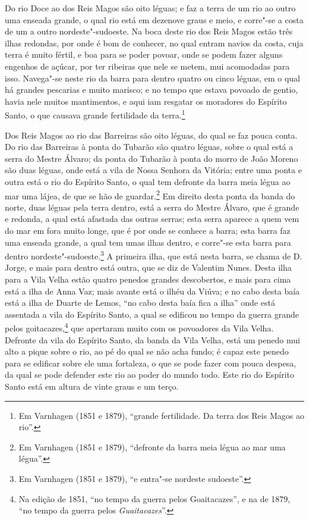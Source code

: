 Do rio Doce ao dos Reis Magos são oito léguas; e faz a terra de um rio ao outro uma
enseada grande, o qual rio está em dezenove graus e meio, e corre"-se a costa de um a outro
nordeste"-sudoeste. Na boca deste rio dos Reis Magos estão três ilhas redondas, por onde é
bom de conhecer, no qual entram navios da costa, cuja terra é muito fértil, e boa para se
poder povoar, onde se podem fazer alguns engenhos de açúcar, por ter ribeiras que nele se
metem, mui acomodadas para isso. Navega"-se neste rio da barra para dentro quatro ou cinco
léguas, em o qual há grandes pescarias e muito marisco; e no tempo que estava povoado de
gentio, havia nele muitos mantimentos, e aqui iam resgatar os moradores do Espírito Santo,
o que causava grande fertilidade da terra.\footnote{ Em Varnhagen (1851 e 1879), ``grande
fertilidade. Da terra dos Reis Magos ao rio''.}

Dos Reis Magos ao rio das Barreiras são oito léguas, do qual se faz pouca conta. Do rio
das Barreiras à ponta do Tubarão são quatro léguas, sobre o qual está a serra do Mestre
Álvaro; da ponta do Tubarão à ponta do morro de João Moreno são duas léguas, onde está a
vila de Nossa Senhora da Vitória; entre uma ponta e outra está o rio do Espírito Santo, o
qual tem defronte da barra meia légua ao mar uma lájea, de que se hão de
guardar.\footnote{ Em Varnhagen (1851 e 1879), ``defronte da barra meia légua ao mar uma
légua''.} Em direito desta ponta da banda do norte, duas léguas pela terra dentro, está a
serra do Mestre Álvaro, que é grande e redonda, a qual está afastada das outras serras;
esta serra aparece a quem vem do mar em fora muito longe, que é por onde se conhece a
barra; esta barra faz uma enseada grande, a qual tem umas ilhas dentro, e corre"-se esta
barra para dentro nordeste"-sudoeste.\footnote{ Em Varnhagen (1851 e 1879), ``e entra"-se
nordeste sudoeste''.} A primeira ilha, que está nesta barra, se chama de D. Jorge, e mais
para dentro está outra, que se diz de Valentim Nunes. Desta ilha para a Vila Velha estão
quatro penedos grandes descobertos, e mais para cima está a ilha de Anna Vaz; mais avante
está o ilhéu da Viúva; e no cabo desta baía está a ilha de Duarte de Lemos, ``no cabo
desta baía fica a ilha'' onde está assentada a vila do Espírito Santo, a qual se edificou
no tempo da guerra grande pelos goitacazes,\footnote{ Na edição de 1851, ``no tempo da
guerra pelos Goaitacazes'', e na de 1879, ``no tempo da guerra pelos
\textit{Guaitacazes}''.} que apertaram muito com os povoadores da Vila Velha. Defronte da
vila do Espírito Santo, da banda da Vila Velha, está um penedo mui alto a pique sobre o
rio, ao pé do qual se não acha fundo; é capaz este penedo para se edificar sobre ele uma
fortaleza, o que se pode fazer com pouca despesa, da qual se pode defender este rio ao
poder do mundo todo. Este rio do Espírito Santo está em altura de vinte graus e um terço.

